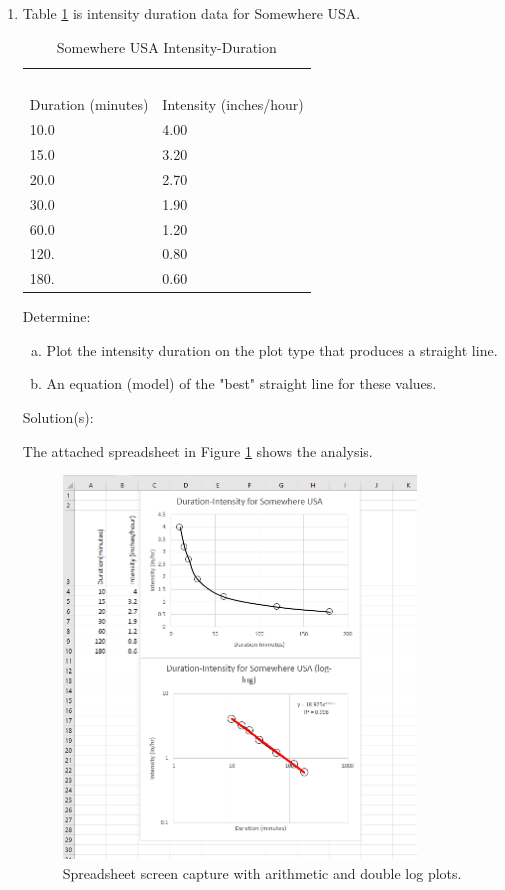 \documentclass[12pt]{article}
\begin{document}
\begin{enumerate}
\clearpage
\item Table \ref{tab:SomewhereUSARainIDF} is intensity duration data for Somewhere USA.

\begin{table}[h!]
\centering
\caption{Somewhere USA Intensity-Duration}
\begin{tabular}{p{2.0in}p{2.0in}} %
~&~\\
Duration (minutes) & Intensity (inches/hour) \\
\hline
\hline
10.0 & 4.00 \\
15.0 & 3.20 \\
20.0 & 2.70 \\
30.0 & 1.90 \\
60.0 & 1.20 \\
120. & 0.80 \\
180. & 0.60 \\
\hline
\end{tabular}
\label{tab:SomewhereUSARainIDF}
\end{table}

Determine:
    \begin{enumerate}[a)]
        \item Plot the intensity duration on the plot type that produces a straight line.
        \item An equation (model) of the "best" straight line for these values. 
    \end{enumerate}

Solution(s):

The attached spreadsheet in Figure \ref{fig:es2-7xls} shows the analysis.  

\begin{figure}[h!] %
   \centering
   \includegraphics[height=4in]{es2-7xls.png} 
   \caption{Spreadsheet screen capture with arithmetic and double log plots.}
   \label{fig:es2-7xls}
\end{figure}


\end{enumerate}
\end{document}
